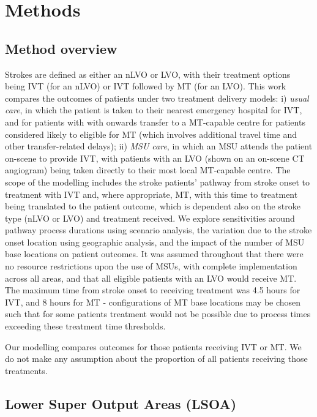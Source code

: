 \section{Methods}

\subsection{Method overview}

Strokes are defined as either an nLVO or LVO, with their treatment options being IVT (for an nLVO) or IVT followed by MT (for an LVO). This work compares the outcomes of patients under two treatment delivery models: i) \emph{usual care}, in which the patient is taken to their nearest emergency hospital for IVT, and for patients with with onwards transfer to a MT-capable centre for patients considered likely to eligible for MT (which involves additional travel time and other transfer-related delays); ii) \textit{MSU care}, in which an MSU attends the patient on-scene to provide IVT, with patients with an LVO (shown on an on-scene CT angiogram) being taken directly to their most local MT-capable centre. The scope of the modelling includes the stroke patients’ pathway from stroke onset to treatment with IVT and, where appropriate, MT, with this time to treatment being translated to the patient outcome, which is dependent also on the stroke type (nLVO or LVO) and treatment received. We explore sensitivities around pathway process durations using scenario analysis, the variation due to the stroke onset location using geographic analysis, and the impact of the number of MSU base locations on patient outcomes. It was assumed throughout that there were no resource restrictions upon the use of MSUs, with complete implementation across all areas, and that all eligible patients with an LVO would receive MT. The maximum time from stroke onset to receiving treatment was 4.5 hours for IVT, and 8 hours for MT - configurations of MT base locations may be chosen such that for some patients treatment would not be possible due to process times exceeding these treatment time thresholds.

Our modelling compares outcomes for those patients receiving IVT or MT. We do not make any assumption about the proportion of all patients receiving those treatments.

\subsection{Lower Super Output Areas (LSOA)}


